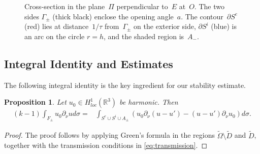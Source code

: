 ﻿\documentclass[11pt,reqno,oneside]{amsart}
\newtheorem{proposition}[theorem]{Proposition}
\theoremstyle{definition}
\theoremstyle{remark}
\newcommand{\R}{\mathbb{R}}
\newcommand{\p}{\partial}
\renewcommand{\O}{\Omega}
\begin{document}
\begin{figure}[ht]
            \caption{Cross-section in the plane~$\Pi$ perpendicular to~$E$ at~$O$.
            The two sides $\Gamma_\pm$ (thick black) enclose the opening angle~$a$.
            The contour~$\partial S^e$ (red) lies at distance~$1/\tau$ from~$\Gamma_\pm$ on the exterior side,
            $\partial S^i$ (blue) is an arc on the circle $r=h$,
            and the shaded region is~$A_-$.}
            \label{fig:cross-section}
        \end{figure}

        \subsection{Integral Identity and Estimates}

        The following integral identity is the key ingredient for our stability estimate.

        \begin{proposition}\label{prop:int-identity}
            Let $u_0\in H^1_{loc}(\R^3)$ be harmonic. Then
            \begin{align}\label{eq:int-id}
                (k-1)\int_{F_{\pm}}u_0\p_\nu u d\sigma= &\int_{S^e \cup S^i\cup A_{\pm}} \left(u_0\p_\nu (u-u')-(u-u')\p_\nu u_0\right)d\sigma.
            \end{align}
        \end{proposition}
        \begin{proof}
            The proof follows by applying Green's formula in the regions $\widetilde{\O}\setminus \widetilde{D}$ and $\widetilde{D}$, together with the transmission conditions in \eqref{eq:transmission}.
        \end{proof}
\end{document}

